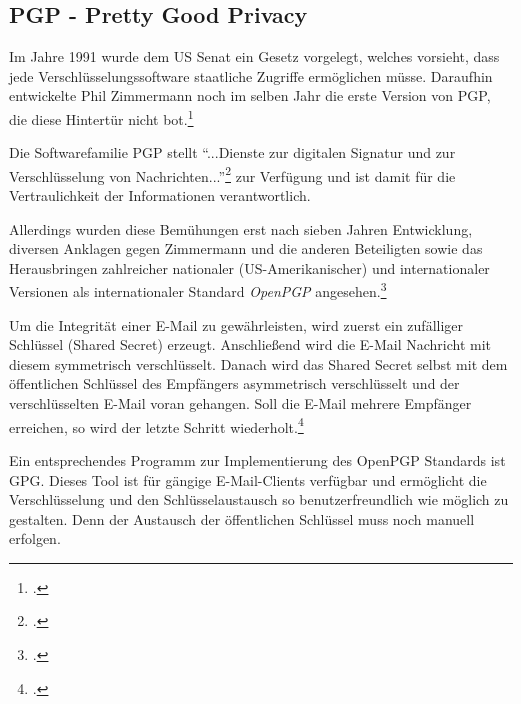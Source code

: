 \documentclass  [paper=a4,
				fontsize=12pt,
				listof=totoc,
				bibliography=totoc
				]{scrreprt}
\begin{document}
			\subsection{PGP - Pretty Good Privacy}
			\label{subsec:pgp}
				Im Jahre 1991 wurde dem US Senat ein Gesetz vorgelegt, welches vorsieht, dass jede Verschlüsselungssoftware staatliche Zugriffe ermöglichen müsse. Daraufhin entwickelte Phil Zimmermann noch im selben Jahr die erste Version von \ac{PGP}, die diese Hintertür nicht bot.\footcite[vgl.][S. 29]{Schwenk}
			
				Die Softwarefamilie \acl{PGP} stellt ``...Dienste zur digitalen Signatur und zur Verschlüsselung von Nachrichten...''\footcite{Mueller2011} zur Verfügung und ist damit für die Vertraulichkeit der Informationen verantwortlich.
				
				Allerdings wurden diese Bemühungen erst nach sieben Jahren Entwicklung, diversen Anklagen gegen Zimmermann und die anderen Beteiligten sowie das Herausbringen zahlreicher nationaler (US-Amerikanischer) und internationaler Versionen als internationaler Standard \textit{OpenPGP} angesehen.\footcite[][S. 29-35]{Schwenk}
				\medskip
				
				
				Um die Integrität einer E-Mail zu gewährleisten, wird zuerst ein zufälliger Schlüssel (Shared Secret) erzeugt. Anschließend wird die E-Mail Nachricht mit diesem symmetrisch verschlüsselt. Danach wird das Shared Secret selbst mit dem öffentlichen Schlüssel des Empfängers asymmetrisch verschlüsselt und der verschlüsselten E-Mail voran gehangen. Soll die E-Mail mehrere Empfänger erreichen, so wird der letzte Schritt wiederholt.\footcite[vgl.][S. 43]{Schwenk}
				\medskip
				
				
				Ein entsprechendes Programm zur Implementierung des OpenPGP Standards ist \ac{GPG}. Dieses Tool ist für gängige E-Mail-Clients verfügbar und ermöglicht die Verschlüsselung und den Schlüsselaustausch so benutzerfreundlich wie möglich zu gestalten. Denn der Austausch der öffentlichen Schlüssel muss noch manuell erfolgen.
				\medskip
				
							
\end{document}
